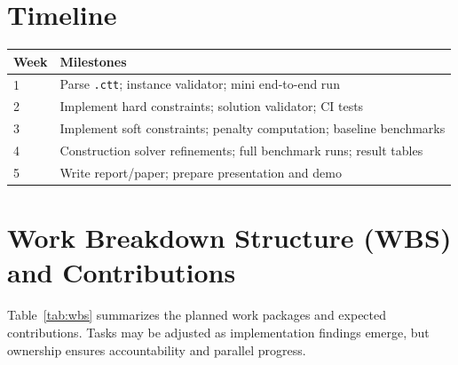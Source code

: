 \documentclass[11pt,letterpaper]{article}
\begin{document}
\section{Timeline}
\begin{center}
\begin{tabular}{@{}ll@{}}
\toprule
\textbf{Week} & \textbf{Milestones} \\
\midrule
1 & Parse \texttt{.ctt}; instance validator; mini end-to-end run \\
2 & Implement hard constraints; solution validator; CI tests \\
3 & Implement soft constraints; penalty computation; baseline benchmarks \\
4 & Construction solver refinements; full benchmark runs; result tables \\
5 & Write report/paper; prepare presentation and demo \\
\bottomrule
\end{tabular}
\end{center}

\section{Work Breakdown Structure (WBS) and Contributions}
Table~\ref{tab:wbs} summarizes the planned work packages and expected contributions. Tasks may be adjusted as implementation findings emerge, but ownership ensures accountability and parallel progress.
\end{document}
